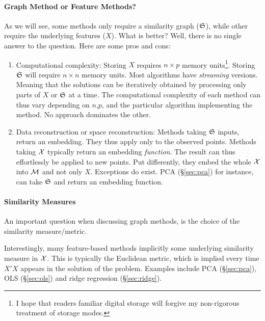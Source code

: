 \paragraph{Graph Method or Feature Methods?}
As we will see, some methods only require a similarity graph ($\mathfrak{S}$), while other require the underlying features ($X$).
What is better?
Well, there is no single answer to the question.
Here are some pros and cons:
\begin{enumerate}
\item Computational complexity: 
Storing $X$ requires $n \times p$ memory units\footnote{ I hope that readers familiar digital storage will forgive my non-rigorous treatment of storage modes.}.
Storing $\mathfrak{S}$ will require $n \times n$ memory units.
Most algorithms have \emph{streaming} versions. Meaning that the solutions can be iteratively obtained by processing only parts of $X$ or $\mathfrak{S}$ at a time. 
The computational complexity of each method can thus vary depending on $n$,$p$, and the particular algorithm implementing the method. 
No approach dominates the other.

\item Data reconstruction or space reconstruction:
Methods taking $\mathfrak{S}$ inputs, return an embedding. They thus apply only to the observed points.
Methods taking $\mathcal{X}$ typically return an embedding \emph{function}. The result can thus effortlessly be applied to new points. Put differently, they embed the whole $\mathcal{X}$ into $\mathcal{M}$ and not only $X$. 
Exceptions do exist. PCA (\S\ref{sec:pca}) for instance, can take $\mathfrak{S}$ and return an embedding function.
\end{enumerate}


\paragraph{Similarity Measures}
An important question when discussing graph methods, is the choice of the similarity measure/metric.

Interestingly, many feature-based methods implicitly some underlying similarity measure in $\mathcal{X}$.
This is typically the Euclidean metric, which is implied every time $X'X$ appears in the solution of the problem. Examples include PCA (\S\ref{sec:pca}), OLS (\S\ref{sec:ols}) and ridge regression (\S\ref{sec:ridge}).

